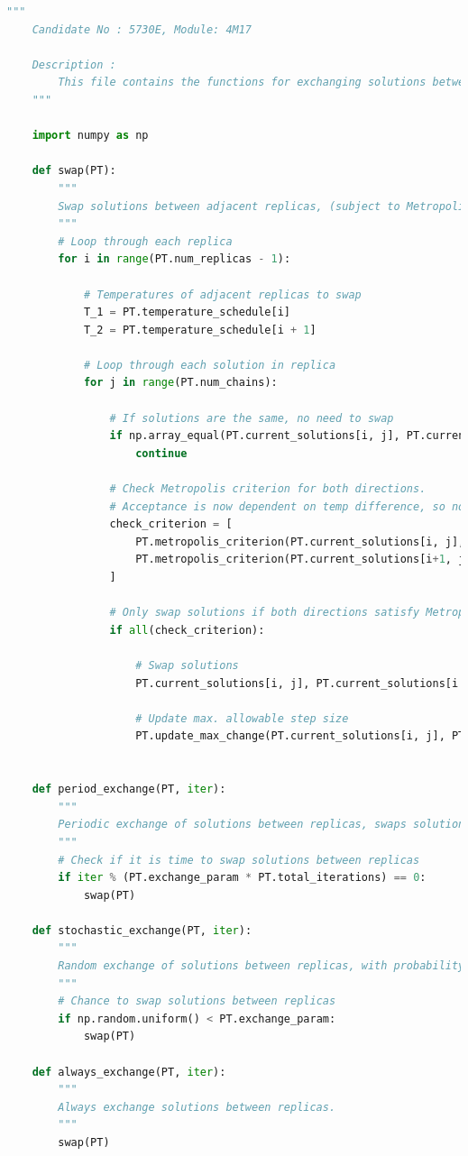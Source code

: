 \documentclass[10pt]{article}
\begin{document}
\begin{lstlisting}[language=Python, caption=replica\_exchange\_functions.py, label=replica_exchange_functionspy]
    """
    Candidate No : 5730E, Module: 4M17 
    
    Description : 
        This file contains the functions for exchanging solutions between replicas.
    """
    
    import numpy as np
    
    def swap(PT):
        """
        Swap solutions between adjacent replicas, (subject to Metropolis criterion).
        """ 
        # Loop through each replica
        for i in range(PT.num_replicas - 1):
            
            # Temperatures of adjacent replicas to swap
            T_1 = PT.temperature_schedule[i]
            T_2 = PT.temperature_schedule[i + 1]
    
            # Loop through each solution in replica
            for j in range(PT.num_chains):
    
                # If solutions are the same, no need to swap
                if np.array_equal(PT.current_solutions[i, j], PT.current_solutions[i + 1, j]):
                    continue
    
                # Check Metropolis criterion for both directions. 
                # Acceptance is now dependent on temp difference, so now both temps are sent in as args
                check_criterion = [
                    PT.metropolis_criterion(PT.current_solutions[i, j], PT.current_solutions[i + 1, j], T_1, T_2),
                    PT.metropolis_criterion(PT.current_solutions[i+1, j], PT.current_solutions[i , j], T_2, T_1)
                ]
    
                # Only swap solutions if both directions satisfy Metropolis criterion
                if all(check_criterion):
    
                    # Swap solutions
                    PT.current_solutions[i, j], PT.current_solutions[i + 1, j] = PT.current_solutions[i + 1, j], PT.current_solutions[i, j]
    
                    # Update max. allowable step size
                    PT.update_max_change(PT.current_solutions[i, j], PT.current_solutions[i + 1, j], i, j)
    
    
    def period_exchange(PT, iter):
        """
        Periodic exchange of solutions between replicas, swaps solutions every PT.exchange_param*NUM_ITERS.
        """
        # Check if it is time to swap solutions between replicas
        if iter % (PT.exchange_param * PT.total_iterations) == 0:
            swap(PT)
    
    def stochastic_exchange(PT, iter):
        """
        Random exchange of solutions between replicas, with probability PT.exchange_param.
        """
        # Chance to swap solutions between replicas
        if np.random.uniform() < PT.exchange_param:
            swap(PT)
    
    def always_exchange(PT, iter):
        """
        Always exchange solutions between replicas.
        """
        swap(PT)    
\end{lstlisting}
\end{document}
